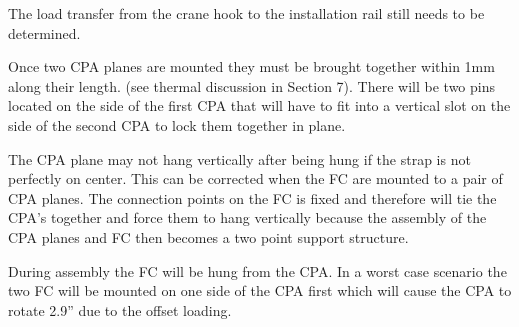 The load transfer from the crane hook to the installation rail still needs to be determined.  

Once two CPA planes are mounted they must be brought together within 1mm along their length.  (see thermal discussion in Section 7).  There will be two pins located on the side of the first CPA that will have to fit into a vertical slot on the side of the second CPA to lock them together in plane.  

The CPA plane may not hang vertically after being hung if the strap is not perfectly on center.  This can be corrected when the FC are mounted to a pair of CPA planes.  The connection points on the FC is fixed and therefore will tie the CPA’s together and force them to hang vertically because the assembly of the CPA planes and FC then becomes a two point support structure.  

During assembly the FC will be hung from the CPA.  In a worst case scenario the two FC will be mounted on one side of the CPA first which will cause the CPA to rotate 2.9'' due to the offset loading.  


